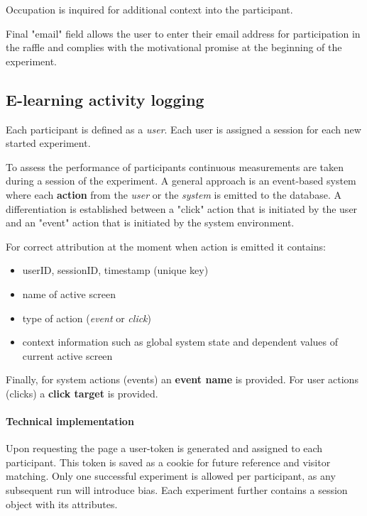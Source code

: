 	Occupation is inquired for additional context into the participant.
	
	Final "email" field allows the user to enter their email address for participation in the raffle and complies with the motivational promise at the beginning of the experiment.

	\subsection{E-learning activity logging} \label{sec:activitylog}
	
	Each participant is defined as a \textit{user}. Each user is assigned a session for each new started experiment. 
	
	To assess the performance of participants continuous measurements are taken during a session of the experiment. A general approach is an event-based system where each \textbf{action} from the \textit{user} or the \textit{system} is emitted to the database. A differentiation is established between a "click" action that is initiated by the user and an "event" action that is initiated by the system environment.
	
	For correct attribution at the moment when action is emitted it contains: 
	\begin{itemize}
		\item userID, sessionID, timestamp (unique key)
		\item name of active screen
		\item type of action (\textit{event} or \textit{click})
		\item context information such as global system state and dependent values of current active screen
	\end{itemize}

	Finally, for system actions (events) an \textbf{event name} is provided. For user actions (clicks) a \textbf{click target} is provided.
	

	

		
		\paragraph{Technical implementation}
		
		Upon requesting the page a user-token is generated and assigned to each participant. 
		This token is saved as a cookie for future reference and visitor matching. 
		Only one successful experiment is allowed per participant, as any subsequent run will introduce bias.
		Each experiment further contains a session object with its attributes. 
		
